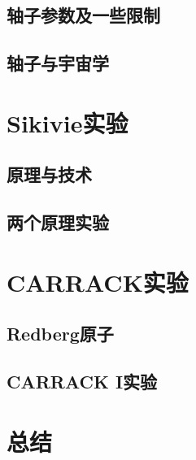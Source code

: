 \documentclass[twocolumn,12pt,a4paper]{article}
\begin{document}
\subsection{轴子参数及一些限制}
\subsection{轴子与宇宙学}

\section{Sikivie实验}
\subsection{原理与技术}
\subsection{两个原理实验}

\section{CARRACK实验}
\subsection{Redberg原子}
\subsection{CARRACK I实验}

\section{总结}

\medskip
\renewcommand{\refname}{参考文献}
\printbibliography
\end{document}
